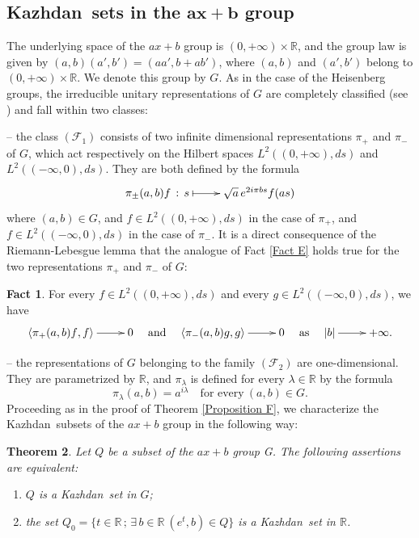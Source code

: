 \documentclass[11pt,english,a4paper]{smfart}
\numberwithin{equation}{section}
\newtheorem{theorem}{Theorem}[section]
\theoremstyle{definition}
\newtheorem{fact}[theorem]{Fact}
\begin{document}
\subsection{{Kazhdan}\ sets in the $\bm{ax+b}$ group}
The underlying space of the $ax+b$ group is $(0,+\infty )\times {\ensuremath{\mathbb R}}$, and the group law is given by 
$(a,b)(a',b')=(aa',b+ab')$, where $(a,b)$ and $(a',b')$ belong to $ (0,+\infty )\times {\ensuremath{\mathbb R}}$. We denote this group by $G$. As in the case of the Heisenberg groups, the irreducible unitary representations of $G$ are completely classified (see \cite[Sec.~6.7]{Fo}) and fall within two classes:
\par\smallskip 
-- the class $(\mathcal{F}_{1})$ consists of two infinite dimensional representations $\pi _{+}$ and $\pi _{-}$ of $G$, which act respectively on the Hilbert spaces $L^{2}((0,+\infty ),ds)$ and $L^{2}((-\infty ,0),ds)$. They are both defined by the formula
\[
\xymatrix{
\pi _{\pm}(a,b)f\,:\,s\ar@{|->}[r]&\sqrt{a}\,e^{2i\pi bs}f(as)
}
\] where $(a,b)\in G$, and $f\in L^{2}((0,+\infty ),ds)$ in the case of $\pi _{+}$, and  $f\in L^{2}((-\infty ,0),ds)$ in the case of $\pi _{-}$. It is a direct consequence of the Riemann-Lebesgue lemma that the analogue of Fact \ref{Fact E} holds true for the two representations $\pi _{+}$ and $\pi _{-}$ of $G$:
\begin{fact}\label{Fact M}
 For every $f\in L^{2}((0,+\infty ),ds)$ and every $g\in L^{2}((-\infty ,0),ds)$, we have
\[
\xymatrix{{\ensuremath{{\langle {\pi _{+}(a,b)f},{f}\rangle}}}\ar[r]&0}\quad \textrm{and}\quad \xymatrix{{\ensuremath{{\langle {\pi _{-}(a,b)g},{g}\rangle}}}\ar[r]&0}\quad\textrm{as}\quad
\xymatrix{|b|\ar[r]&+\infty .}
\]
\end{fact}
\par\smallskip 
-- the representations of $G$ belonging to the family $(\mathcal{F}_{2})$ are one-dimensional. They are parametrized by ${\ensuremath{\mathbb R}}$, and $\pi _{\lambda }$ is defined for every $\lambda \in{\ensuremath{\mathbb R}}$ by the formula
\[
\pi _{\lambda }(a,b)=a^{i\lambda }\quad\textrm{for every}\ (a,b)\in G.
\]
Proceeding as in the proof of Theorem \ref{Proposition F}, we characterize the {Kazhdan}\ subsets of the $ax+b$ group in the following way:
\begin{theorem}\label{Proposition N}
 Let ${Q}$ be a subset of the $ax+b$ group G. The following assertions are equivalent:
\begin{enumerate}
 \item [{(1)}] ${Q}$ is a {Kazhdan}\ set in $G$;
\item[{(2)}] the set ${Q}_{0}=\{t\in{\ensuremath{\mathbb R}}\,;\,\exists\,b\in{\ensuremath{\mathbb R}}\ (e^{t},b)\in{Q}\}$ is a {Kazhdan}\ set in ${\ensuremath{\mathbb R}}$.
\end{enumerate}
\end{theorem}
\end{document}
